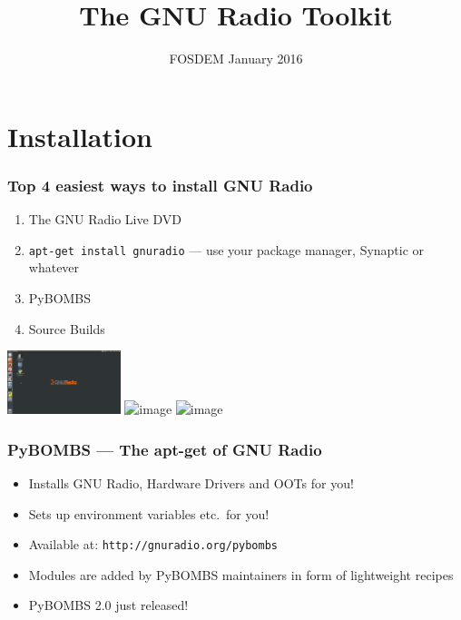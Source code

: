 \documentclass{beamer}
\title{The GNU Radio Toolkit}
\institute{Martin Braun, Ettus Research}
\date{FOSDEM January 2016}
\begin{document}
\frame{\titlepage}

\section{Installation}
\begin{frame}
  \frametitle{Top 4 easiest ways to install GNU Radio}
  \begin{enumerate}
    \item The GNU Radio Live DVD
    \item<2-> \texttt{apt-get install gnuradio} --- use your package manager, Synaptic or whatever
    \item<3-> PyBOMBS
    \item<4-> Source Builds
  \end{enumerate}
    \hspace{3em}
    \includegraphics[height=5em]{grlivedvd}
    \hspace{1em}
    \includegraphics<3->[height=5em]{pybombs_logo}
    \hspace{1em}
    \includegraphics<4->[height=5em]{srcbuild}
\end{frame}

\begin{frame}
  \frametitle{PyBOMBS --- The apt-get of GNU Radio}
  \begin{itemize}
    \item Installs GNU Radio, Hardware Drivers and OOTs for you!
    \item Sets up environment variables etc.\ for you!
    \item Available at: \texttt{http://gnuradio.org/pybombs}
    \item Modules are added by PyBOMBS maintainers in form of lightweight recipes
    \item PyBOMBS 2.0 just released!
  \end{itemize}
\end{frame}
\end{document}
